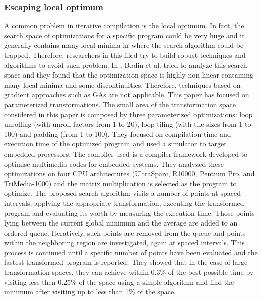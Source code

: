 

\subsubsection{Escaping local optimum}


A common problem in iterative compilation is the local optimum. In fact, the search space of optimizations for a specific program could be very huge and it generally contains many local minima in where the search algorithm could be trapped\cite{bodin1998iterative}. Therefore, researchers in this filed try to build robust techniques and algorithms to avoid such problem.
In \cite{bodin1998iterative}, Bodin et al. tried to analyze this search space and they found that the optimization space is highly non-linear containing many local minima and some discontinuities. Therefore, techniques based on gradient approaches such as GAs are not applicable.
This paper has focused on parameterized transformations. The small area of the transformation space considered in this paper is composed by three parameterized optimizations: loop unrolling (with unroll factors from 1 to 20), loop tiling (with tile sizes from 1 to 100) and padding (from 1 to 100). They focused on compilation time and execution time of the optimized program and used a simulator to target embedded processors. The compiler used is a compiler framework developed to optimise multimedia codes for embedded systems.
They analyzed these optimizations on four CPU architectures (UltraSparc, R10000, Pentium Pro, and TriMedia-1000) and the matrix multiplication is selected as the program to optimize.
The proposed search algorithm visits a number of points at spaced intervals, applying the appropriate transformation, executing
the transformed program and evaluating its worth by measuring the execution time. Those points lying between
the current global minimum and the average are added to an ordered queue. Iteratively, such points are removed from the queue and points within the neighboring region are investigated, again at spaced intervals. This process is continued until a specific number of points have been evaluated and the fastest transformed program is reported.
They showed that in the case of large transformation spaces, they can achieve within 0.3\% of the best possible time by visiting less then 0.25\% of the space using a simple algorithm and find the minimum after visiting up to less than 1\% of the space.

